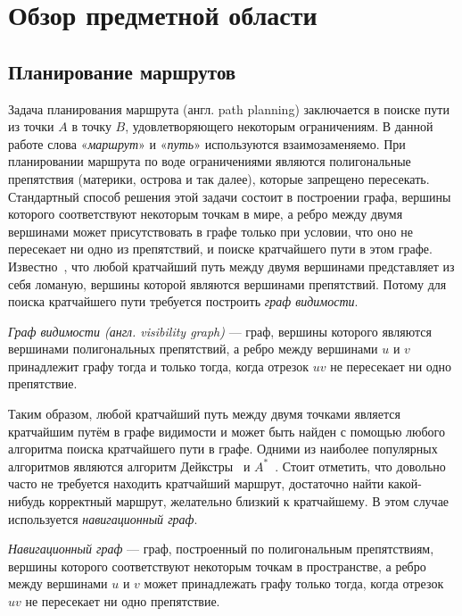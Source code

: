\chapter{Обзор предметной области}

\label{ch:review}

\section{Планирование маршрутов}

\label{sec:path-planning}

Задача планирования маршрута (англ. path planning) заключается в
поиске пути из точки $A$ в точку $B$, удовлетворяющего некоторым
ограничениям. В данной работе слова «\emph{маршрут}» и «\emph{путь}»
используются взаимозаменяемо. При планировании маршрута по воде
ограничениями являются полигональные препятствия (материки, острова и
так далее), которые запрещено пересекать. Стандартный способ решения
этой задачи состоит в построении графа, вершины которого соответствуют
некоторым точкам в мире, а ребро между двумя вершинами может
присутствовать в графе только при условии, что оно не пересекает ни
одно из препятствий, и поиске кратчайшего пути в этом графе.
Известно~\cite{visibility-proof}, что любой кратчайший путь между
двумя вершинами представляет из себя ломаную, вершины которой являются
вершинами препятствий. Потому для поиска кратчайшего пути требуется
построить \emph{граф видимости}.

\emph{Граф видимости (англ. visibility graph)} --- граф, вершины
которого являются вершинами полигональных препятствий, а ребро между
вершинами $u$ и $v$ принадлежит графу тогда и только тогда, когда
отрезок $uv$ не пересекает ни одно препятствие.

Таким образом, любой кратчайший путь между двумя точками является
кратчайшим путём в графе видимости и может быть найден с помощью
любого алгоритма поиска кратчайшего пути в графе. Одними из наиболее
популярных алгоритмов являются алгоритм
Дейкстры~\cite{dijkstra1959note} и $A^*$~\cite{hart1968formal}. Стоит
отметить, что довольно часто не требуется находить кратчайший маршрут,
достаточно найти какой-нибудь корректный маршрут, желательно близкий к
кратчайшему. В этом случае используется \emph{навигационный граф}.

\emph{Навигационный граф} --- граф, построенный по полигональным
препятствиям, вершины которого соответствуют некоторым точкам в
пространстве, а ребро между вершинами $u$ и $v$ может принадлежать
графу только тогда, когда отрезок $uv$ не пересекает ни одно
препятствие.

